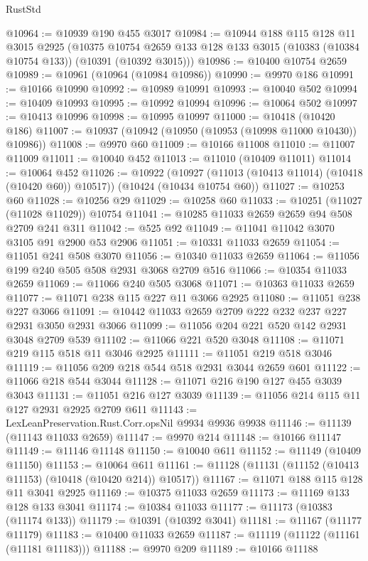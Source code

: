 \begin{lexlean}{RustStd}
\begin{coremodule}
@10964 := @10939 @190 @455 @3017
@10984 := @10944
    @188
    @115
    @128
    @11
    @3015
    @2925
    (@10375 @10754 @2659 @133 @128 @133 @3015 (@10383 (@10384 @10754 @133)) (@10391 (@10392 @3015)))
@10986 := @10400 @10754 @2659
@10989 := @10961 (@10964 (@10984 @10986))
@10990 := @9970 @186
@10991 := @10166 @10990
@10992 := @10989 @10991
@10993 := @10040 @502
@10994 := @10409 @10993
@10995 := @10992 @10994
@10996 := @10064 @502
@10997 := @10413 @10996
@10998 := @10995 @10997
@11000 := @10418 (@10420 @186)
@11007 := @10937 (@10942 (@10950 (@10953 (@10998 @11000 @10430)) @10986))
@11008 := @9970 @60
@11009 := @10166 @11008
@11010 := @11007 @11009
@11011 := @10040 @452
@11013 := @11010 (@10409 @11011)
@11014 := @10064 @452
@11026 := @10922
    (@10927 (@11013 (@10413 @11014) (@10418 (@10420 @60)) @10517))
    (@10424 (@10434 @10754 @60))
@11027 := @10253 @60
@11028 := @10256 @29
@11029 := @10258 @60
@11033 := @10251 (@11027 (@11028 @11029)) @10754
@11041 := @10285 @11033 @2659 @2659 @94 @508 @2709 @241 @311
@11042 := @525 @92
@11049 := @11041 @11042 @3070 @3105 @91 @2900 @53 @2906
@11051 := @10331 @11033 @2659
@11054 := @11051 @241 @508 @3070
@11056 := @10340 @11033 @2659
@11064 := @11056 @199 @240 @505 @508 @2931 @3068 @2709 @516
@11066 := @10354 @11033 @2659
@11069 := @11066 @240 @505 @3068
@11071 := @10363 @11033 @2659
@11077 := @11071 @238 @115 @227 @11 @3066 @2925
@11080 := @11051 @238 @227 @3066
@11091 := @10442 @11033 @2659 @2709 @222 @232 @237 @227 @2931 @3050 @2931 @3066
@11099 := @11056 @204 @221 @520 @142 @2931 @3048 @2709 @539
@11102 := @11066 @221 @520 @3048
@11108 := @11071 @219 @115 @518 @11 @3046 @2925
@11111 := @11051 @219 @518 @3046
@11119 := @11056 @209 @218 @544 @518 @2931 @3044 @2659 @601
@11122 := @11066 @218 @544 @3044
@11128 := @11071 @216 @190 @127 @455 @3039 @3043
@11131 := @11051 @216 @127 @3039
@11139 := @11056 @214 @115 @11 @127 @2931 @2925 @2709 @611
@11143 := LexLeanPreservation.Rust.Corr.opsNil @9934 @9936 @9938
@11146 := @11139 (@11143 @11033 @2659)
@11147 := @9970 @214
@11148 := @10166 @11147
@11149 := @11146 @11148
@11150 := @10040 @611
@11152 := @11149 (@10409 @11150)
@11153 := @10064 @611
@11161 := @11128 (@11131 (@11152 (@10413 @11153) (@10418 (@10420 @214)) @10517))
@11167 := @11071 @188 @115 @128 @11 @3041 @2925
@11169 := @10375 @11033 @2659
@11173 := @11169 @133 @128 @133 @3041
@11174 := @10384 @11033
@11177 := @11173 (@10383 (@11174 @133))
@11179 := @10391 (@10392 @3041)
@11181 := @11167 (@11177 @11179)
@11183 := @10400 @11033 @2659
@11187 := @11119 (@11122 (@11161 (@11181 @11183)))
@11188 := @9970 @209
@11189 := @10166 @11188

\end{coremodule}
\end{lexlean}
